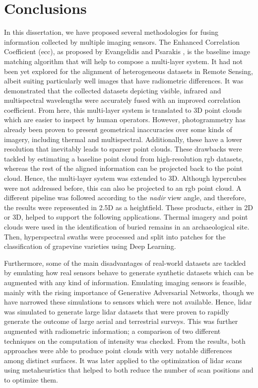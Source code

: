 \setchapterpreamble[u]{\margintoc}
\chapter{Conclusions}
\label{sec:conclusions}

In this dissertation, we have proposed several methodologies for fusing information collected by multiple imaging sensors. The Enhanced Correlation Coefficient (\acrshort{ecc}), as proposed by Evangelidis and Psarakis \cite{evangelidis_parametric_2008}, is the baseline image matching algorithm that will help to compose a multi-layer system. It had not been yet explored for the alignment of heterogeneous datasets in Remote Sensing, albeit suiting particularly well images that have radiometric differences. It was demonstrated that the collected datasets depicting visible, infrared and multispectral wavelengths were accurately fused with an improved correlation coefficient. From here, this multi-layer system is translated to 3D point clouds which are easier to inspect by human operators. However, photogrammetry has already been proven to present geometrical inaccuracies over some kinds of imagery, including thermal and multispectral. Additionally, these have a lower resolution that inevitably leads to sparser point clouds. These drawbacks were tackled by estimating a baseline point cloud from high-resolution \acrshort{rgb} datasets, whereas the rest of the aligned information can be projected back to the point cloud. Hence, the multi-layer system was extended to 3D. Although hypercubes were not addressed before, this can also be projected to an \acrshort{rgb} point cloud. A different pipeline was followed according to the \textit{nadir} view angle, and therefore, the results were represented in 2.5D as a heightfield. These products, either in 2D or 3D, helped to support the following applications. Thermal imagery and point clouds were used in the identification of buried remains in an archaeological site. Then, hyperspectral swaths were processed and split into patches for the classification of grapevine varieties using Deep Learning.

Furthermore, some of the main disadvantages of real-world datasets are tackled by emulating how real sensors behave to generate synthetic datasets which can be augmented with any kind of information. Emulating imaging sensors is feasible, mainly with the rising importance of Generative Adversarial Networks, though we have narrowed these simulations to sensors which were not available. Hence, \acrshort{lidar} was simulated to generate large \acrshort{lidar} datasets that were proven to rapidly generate the outcome of large aerial and terrestrial surveys. This was further augmented with radiometric information; a comparison of two different techniques on the computation of intensity was checked. From the results, both approaches were able to produce point clouds with very notable differences among distinct surfaces. It was later applied to the optimization of \acrshort{lidar} scans using metaheuristics that helped to both reduce the number of scan positions and to optimize them.

